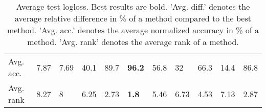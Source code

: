 \begin{table}[ht!]
\begin{tabular}{lllllllllll}
  Avg. acc. & 7.87 & 7.69 & 40.1 & 89.7 & \textbf{96.2} & 56.8 & 32 & 66.3 & 14.4 & 86.8 \\ 
  Avg. rank & 8.27 & 8 & 6.25 & 2.73 & \textbf{1.8} & 5.46 & 6.73 & 4.53 & 7.13 & 2.87 \\ 
   \hline
\hline
\end{tabular}
\endgroup
\caption{Average test logloss. 
                  Best results are bold. 
                  'Avg. diff.' denotes the average relative difference in \% of a method compared to the best method.
                  'Avg. acc.' denotes the average normalized accuracy in \% of a method.
                  'Avg. rank' denotes the average rank of a method.} 
\label{TABLES/table_results_logloss_spatial_depth}
\end{table}
